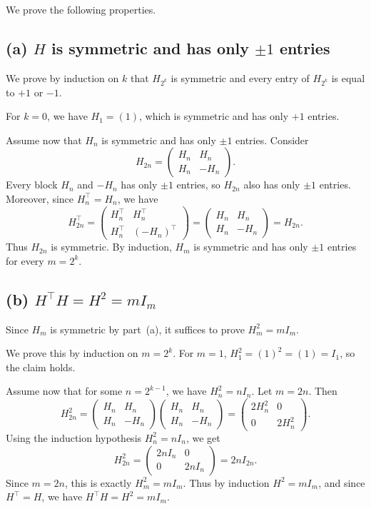 \documentclass{article}
\begin{document}
We prove the following properties.

\subsection*{(a) $H$ is symmetric and has only $\pm 1$ entries}

We prove by induction on $k$ that $H_{2^k}$ is symmetric and every entry of $H_{2^k}$ is equal to $+1$ or $-1$.

For $k=0$, we have $H_1=(1)$, which is symmetric and has only $+1$ entries.

Assume now that $H_n$ is symmetric and has only $\pm 1$ entries. Consider
\[
H_{2n} = \begin{pmatrix} H_n & H_n\\ H_n & -H_n \end{pmatrix}.
\]
Every block $H_n$ and $-H_n$ has only $\pm 1$ entries, so $H_{2n}$ also has only $\pm 1$ entries. Moreover, since $H_n^\top=H_n$, we have
\[
H_{2n}^\top = \begin{pmatrix} H_n^\top & H_n^\top\\ H_n^\top & (-H_n)^\top \end{pmatrix} = \begin{pmatrix} H_n & H_n\\ H_n & -H_n \end{pmatrix} = H_{2n}.
\]
Thus $H_{2n}$ is symmetric. By induction, $H_m$ is symmetric and has only $\pm 1$ entries for every $m=2^k$.

\subsection*{(b) $H^\top H=H^2=mI_m$}

Since $H_m$ is symmetric by part~(a), it suffices to prove $H_m^2=mI_m$.

We prove this by induction on $m=2^k$. For $m=1$, $H_1^2=(1)^2=(1)=I_1$, so the claim holds.

Assume now that for some $n=2^{k-1}$, we have $H_n^2=nI_n$. Let $m=2n$. Then
\[
H_{2n}^2 = \begin{pmatrix} H_n & H_n\\ H_n & -H_n \end{pmatrix} \begin{pmatrix} H_n & H_n\\ H_n & -H_n \end{pmatrix} = \begin{pmatrix} 2H_n^2 & 0\\ 0 & 2H_n^2 \end{pmatrix}.
\]
Using the induction hypothesis $H_n^2=nI_n$, we get
\[
H_{2n}^2 = \begin{pmatrix} 2nI_n & 0\\ 0 & 2nI_n \end{pmatrix} = 2nI_{2n}.
\]
Since $m=2n$, this is exactly $H_m^2=mI_m$. Thus by induction $H^2=mI_m$, and since $H^\top=H$, we have $H^\top H=H^2=mI_m$.
\end{document}
